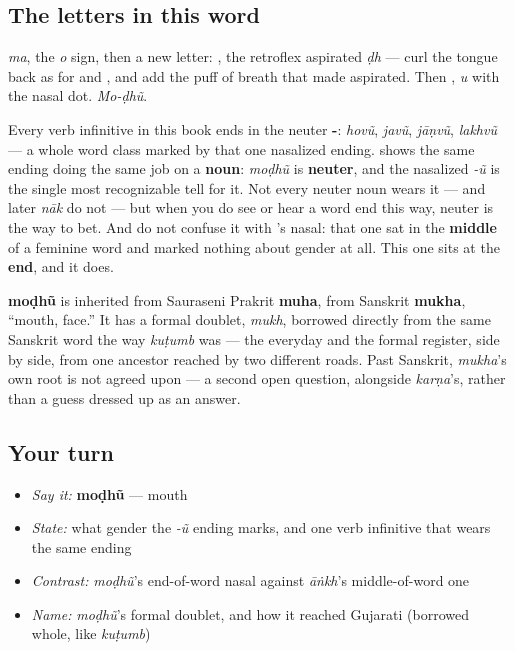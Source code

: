 \subsection*{The letters in this word}
\textbf{} \emph{ma}, \textbf{} the \emph{o} sign, then a new letter: \textbf{}, the retroflex aspirated \emph{ḍh} — curl the tongue back as for \textbf{} and \textbf{}, and add the puff of breath that made \textbf{} aspirated. Then \textbf{}, \emph{u} with the nasal dot. \emph{Mo-ḍhũ}.

\begin{grammarlens}[title={Grammar Lens: the neuter tell, named plainly}]
Every verb infinitive in this book ends in the neuter \textbf{-}: \emph{hovũ}, \emph{javũ}, \emph{jāṇvũ}, \emph{lakhvũ} — a whole word class marked by that one nasalized ending. \textbf{} shows the same ending doing the same job on a \textbf{noun}: \emph{moḍhũ} is \textbf{neuter}, and the nasalized \emph{-ũ} is the single most recognizable tell for it. Not every neuter noun wears it — \textbf{} and later \emph{nāk} do not — but when you do see or hear a word end this way, neuter is the way to bet. And do not confuse it with \textbf{}'s nasal: that one sat in the \textbf{middle} of a feminine word and marked nothing about gender at all. This one sits at the \textbf{end}, and it does.
\end{grammarlens}

\begin{cousinweb}
\textbf{moḍhũ} is inherited from Sauraseni Prakrit \textbf{muha}, from Sanskrit \textbf{mukha}, \textquotedblleft{}mouth, face.\textquotedblright{} It has a formal doublet, \textbf{} \emph{mukh}, borrowed directly from the same Sanskrit word the way \emph{kuṭumb} was — the everyday and the formal register, side by side, from one ancestor reached by two different roads. Past Sanskrit, \emph{mukha}'s own root is not agreed upon — a second open question, alongside \emph{karṇa}'s, rather than a guess dressed up as an answer.
\end{cousinweb}

\subsection*{Your turn}
\begin{itemize}
\raggedright
  \item \emph{Say it:} \textbf{moḍhũ} — mouth
  \item \emph{State:} what gender the \emph{-ũ} ending marks, and one verb infinitive that wears the same ending
  \item \emph{Contrast:} \emph{moḍhũ}'s end-of-word nasal against \emph{āṅkh}'s middle-of-word one
  \item \emph{Name:} \emph{moḍhũ}'s formal doublet, and how it reached Gujarati (borrowed whole, like \emph{kuṭumb})
\end{itemize}

